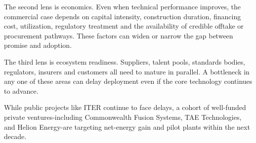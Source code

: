 \documentclass[10pt,a4paper]{article}
\begin{document}
{\small The second lens is economics. Even when technical performance improves, the commercial case depends on capital intensity, construction duration, financing cost, utilization, regulatory treatment and the availability of credible offtake or procurement pathways. These factors can widen or narrow the gap between promise and adoption.}\par
{\small The third lens is ecosystem readiness. Suppliers, talent pools, standards bodies, regulators, insurers and customers all need to mature in parallel. A bottleneck in any one of these areas can delay deployment even if the core technology continues to advance.}\par
{}\par\vspace{1pt}
{\small While public projects like ITER continue to face delays, a cohort of well-funded private ventures-including Commonwealth Fusion Systems, TAE Technologies, and Helion Energy-are targeting net-energy gain and pilot plants within the next decade.}\par
\label{chap:5:end}
\end{document}
